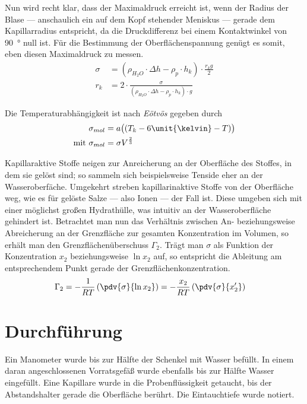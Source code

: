 Nun wird recht klar, dass der Maximaldruck erreicht ist, wenn der Radius der Blase --- anschaulich ein auf dem Kopf stehender Meniskus --- gerade dem Kapillarradius entspricht,
da die Druckdifferenz bei einem Kontaktwinkel von \qty{90}{\degree} null ist.
Für die Bestimmung der Oberflächenspannung genügt es somit, eben diesen Maximaldruck zu messen.
\begin{align}
    \sigma &= ( \rho_{H_{2}O} \cdot \Delta h - \rho_p \cdot h_k) \cdot \frac{r_k g}{2} \label{eqn:oberflächenspannung} \\
    r_k &= 2 \cdot \frac{\sigma}{(\rho_{H_{2}O} \cdot \Delta h - \rho_p \cdot h_k) \cdot g} \label{eqn:kapillarradius}
\end{align}

Die Temperaturabhängigkeit ist nach \textit{Eötvös} gegeben durch
\begin{align}
                \sigma_{mol} &= a \big( (T_k - 6 \text{\unit{\kelvin}} - T) \big) \\
    \text{mit } \sigma_{mol} &= \sigma V^{\frac{2}{3}} \nonumber
\end{align}

Kapillaraktive Stoffe neigen zur Anreicherung an der Oberfläche des Stoffes, in dem sie gelöst sind; so sammeln sich beispielsweise Tenside eher an der Wasseroberfäche.
Umgekehrt streben kapillarinaktive Stoffe von der Oberfläche weg, wie es für gelöste Salze --- also Ionen --- der Fall ist.
Diese umgeben sich mit einer möglichst großen Hydrathülle, was intuitiv an der Wasseroberfläche gehindert ist.
Betrachtet man nun das Verhältnis zwischen An- beziehungsweise Abreicherung an der Grenzfläche zur gesamten Konzentration im Volumen, so erhält man den Grenzflächenüberschuss $\Gamma_2$.
Trägt man $\sigma$ als Funktion der Konzentration $x_2$ beziehungsweise $\ln x_2$ auf, so entspricht die Ableitung am entsprechendem Punkt gerade der Grenzflächenkonzentration.
\begin{align}
    \Gamma_2 &= - \frac{1}{RT} \left( \pdv{\sigma}{\ln x_2} \right) = - \frac{x_2}{RT} \left( \pdv{\sigma}{x_2^{\prime}} \right) \label{eqn:grenzfläche}
\end{align}


\section{Durchführung}

Ein Manometer wurde bis zur Hälfte der Schenkel mit Wasser befüllt.
In einem daran angeschlossenen Vorratsgefäß wurde ebenfalls bis zur Hälfte Wasser eingefüllt.
Eine Kapillare wurde in die Probenflüssigkeit getaucht, bis der Abstandshalter gerade die Oberfläche berührt.
Die Eintauchtiefe wurde notiert.


